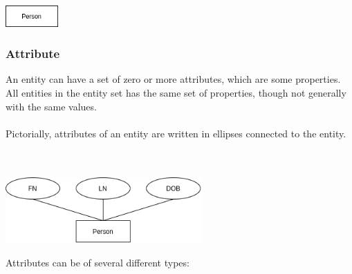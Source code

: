 \documentclass{article}
\begin{document}
\centerline{\includegraphics[width=2cm]{./assets/entity.png}}
	
\subsubsection{Attribute}
An entity can have a set of zero or more attributes, which are some properties. All entities in the entity set has the same set of properties, though not generally with the same values. \\ \\
Pictorially, attributes of an entity are written in ellipses connected to the entity. \\ \\ \\

\centerline{\includegraphics[width=7.5cm]{./assets/attribute.png}}
\vspace{.6cm}
\noindent Attributes can be of several different types:
\end{document}
